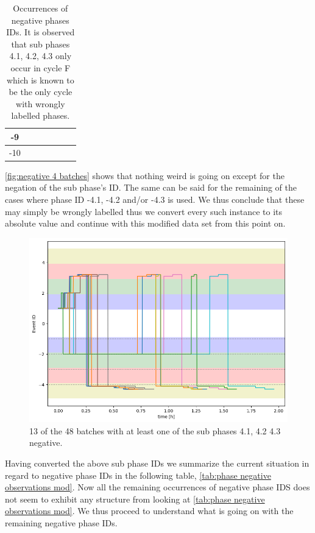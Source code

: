 \documentclass[../Thesis.tex]{subfiles}
\begin{document}
\begin{table}[h]
\begin{tabular}{c|c|c|c|c|c|c}
        -9                     &                      &                      &                      & \cellcolor{black!50} & \cellcolor{black!50} & \cellcolor{black!50} \\\hline
        -10                    &                      & \cellcolor{black!50} &                      & \cellcolor{black!50} & \cellcolor{black!50} & \cellcolor{black!50}
    \end{tabular}
    \caption{Occurrences of negative phases IDs. It is observed that sub phases 4.1, 4.2, 4.3 only occur in cycle F which is known to be the only cycle with wrongly labelled phases.}
    \label{tab:phase negative observations}
\end{table}



\autoref{fig:negative 4 batches} shows that nothing weird is going on except for the negation of the sub phase's ID. The same can be said for the remaining of the cases where phase ID -4.1, -4.2 and/or -4.3 is used. We thus conclude that these may simply be wrongly labelled thus we convert every such instance to its absolute value and continue with this modified data set from this point on.

\begin{figure}[H]
    \centering
    \includegraphics[width=.85\linewidth]{figures/Multiple cycles data/Adding of solids/sample negative sub 4 phases.png}
    \caption{13 of the 48 batches with at least one of the sub phases 4.1, 4.2 4.3 negative.}
    \label{fig:negative 4 batches}
\end{figure}

Having converted the above sub phase IDs we summarize the current situation in regard to negative phase IDs in the following table, \autoref{tab:phase negative observations mod}. Now all the remaining occurrences of negative phase IDS does not seem to exhibit any structure from looking at \autoref{tab:phase negative observations mod}. We thus proceed to understand what is going on with the remaining negative phase IDs.
\end{document}

